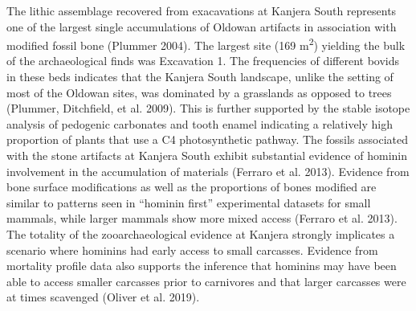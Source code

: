 \documentclass[]{elsarticle} %
\begin{document}
The lithic assemblage recovered from exacavations at Kanjera South
represents one of the largest single accumulations of Oldowan artifacts
in association with modified fossil bone (Plummer 2004). The largest
site (169 m\textsuperscript{2}) yielding the bulk of the archaeological
finds was Excavation 1. The frequencies of different bovids in these
beds indicates that the Kanjera South landscape, unlike the setting of
most of the Oldowan sites, was dominated by a grasslands as opposed to
trees (Plummer, Ditchfield, et al. 2009). This is further supported by
the stable isotope analysis of pedogenic carbonates and tooth enamel
indicating a relatively high proportion of plants that use a C4
photosynthetic pathway. The fossils associated with the stone artifacts
at Kanjera South exhibit substantial evidence of hominin involvement in
the accumulation of materials (Ferraro et al. 2013). Evidence from bone
surface modifications as well as the proportions of bones modified are
similar to patterns seen in ``hominin first'' experimental datasets for
small mammals, while larger mammals show more mixed access (Ferraro et
al. 2013). The totality of the zooarchaeological evidence at Kanjera
strongly implicates a scenario where hominins had early access to small
carcasses. Evidence from mortality profile data also supports the
inference that hominins may have been able to access smaller carcasses
prior to carnivores and that larger carcasses were at times scavenged
(Oliver et al. 2019).
\end{document}
